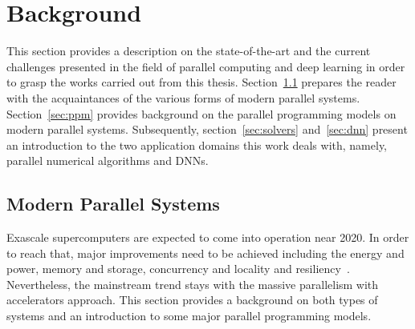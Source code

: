 \chapter{Background}
\label{chap:background}
This section provides a description on the state-of-the-art and the current 
challenges presented in the field of parallel computing and deep learning in 
order to grasp the works carried out from this thesis.
Section~\ref{sec:mps} prepares the reader with the acquaintances of the various 
forms of modern parallel systems. Section~\ref{sec:ppm} provides background on 
the parallel programming models on modern parallel systems. Subsequently, 
section~\ref{sec:solvers} and~\ref{sec:dnn} present an introduction to the two 
application domains this work deals with, namely, parallel numerical algorithms 
and DNNs.

\section{Modern Parallel Systems}
\label{sec:mps}
Exascale supercomputers are expected to come into operation near 2020. In order 
to reach that, major improvements need to be achieved including the energy and 
power, memory and storage, concurrency and locality and resiliency~\cite{doe}.  
Nevertheless, the mainstream trend stays with the massive parallelism with 
accelerators approach. This section provides a background on both types of 
systems and an introduction to some major parallel programming models.

